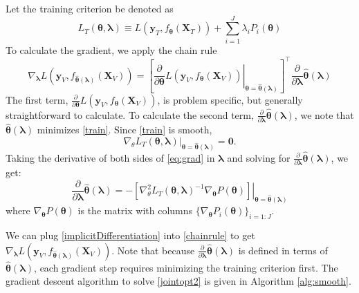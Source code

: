 \documentclass[12pt]{article}
\begin{document}
Let the training criterion be denoted as
\begin{equation}
L_T\left(\boldsymbol \theta, \boldsymbol{\lambda}\right) \equiv L(\boldsymbol{y}_T, f_{\boldsymbol \theta} (\boldsymbol{X}_T)) + \sum\limits_{i=1}^J \lambda_i P_i(\boldsymbol \theta)
\label{train}
\end{equation}
To calculate the gradient, we apply the chain rule
\begin{equation}
\nabla_{\boldsymbol{\lambda}} L \left( \boldsymbol{y}_V, f_{\hat{\boldsymbol \theta}(\boldsymbol{\lambda})}(\boldsymbol{X}_V) \right ) = 
\left [
\left . \frac{\partial}{\partial \boldsymbol \theta} L ( \boldsymbol{y}_V, f_{\boldsymbol \theta}(\boldsymbol{X}_V)) \right |_{\boldsymbol \theta=\hat{\boldsymbol \theta}(\boldsymbol \lambda)}
\right ]^\top 
\frac{\partial}{\partial \boldsymbol{\lambda}} \hat{\boldsymbol \theta}(\boldsymbol{\lambda})
\label{chainrule}
\end{equation}
The first term, $\frac{\partial}{\partial \boldsymbol \theta} L ( \boldsymbol{y}_V, f_{\boldsymbol \theta}(\boldsymbol{X}_V))$, is problem specific, but generally straightforward to calculate. To calculate the second term, $\frac{\partial}{\partial \boldsymbol{\lambda}} \hat{\boldsymbol \theta}(\boldsymbol{\lambda})$, we note that $\hat{\boldsymbol \theta}(\boldsymbol{\lambda})$ minimizes \eqref{train}. Since \eqref{train} is smooth,
\begin{equation}
\nabla_\theta 
L_T(\boldsymbol \theta, \boldsymbol{\lambda})
|_{\boldsymbol \theta = \hat {\boldsymbol \theta}(\boldsymbol{\lambda})}
= \boldsymbol{0}.
\label{eq:grad}
\end{equation}
Taking the derivative of both sides of \eqref{eq:grad} in $\boldsymbol{\lambda}$ and solving for $\frac{\partial}{\partial \boldsymbol{\lambda}} \hat{\boldsymbol \theta}(\boldsymbol{\lambda})$, we get:
\begin{equation}
\frac{\partial}{\partial \boldsymbol{\lambda}} \hat{\boldsymbol \theta}(\boldsymbol{\lambda}) = 
- \left . \left [
 \nabla_\theta^2 L_T (\boldsymbol \theta, \boldsymbol{\lambda} )^{-1}
\nabla_{\boldsymbol \theta} P(\boldsymbol \theta)
\right ]
\right |_{\boldsymbol \theta = \hat {\boldsymbol \theta}(\boldsymbol{\lambda})}
\label{implicitDifferentiation}
\end{equation}
where $\nabla_{\boldsymbol \theta} P(\boldsymbol \theta)$ is the matrix with columns $\{\nabla_{\boldsymbol \theta} P_i(\boldsymbol \theta)\}_{i=1:J}$.

We can plug \eqref{implicitDifferentiation} into \eqref{chainrule} to get $\nabla_{\boldsymbol{\lambda}} L \left ( \boldsymbol{y}_V, f_{\hat{\boldsymbol \theta}(\boldsymbol{\lambda})}(\boldsymbol{X}_V) \right )$. Note that because $\frac{\partial}{\partial \boldsymbol{\lambda}} \hat{\boldsymbol \theta}(\boldsymbol{\lambda})$ is defined in terms of $\hat{\boldsymbol \theta}\left(\boldsymbol{\lambda}\right)$, each gradient step requires minimizing the training criterion first. The gradient descent algorithm to solve \eqref{jointopt2} is given in Algorithm \ref{alg:smooth}.
\end{document}
